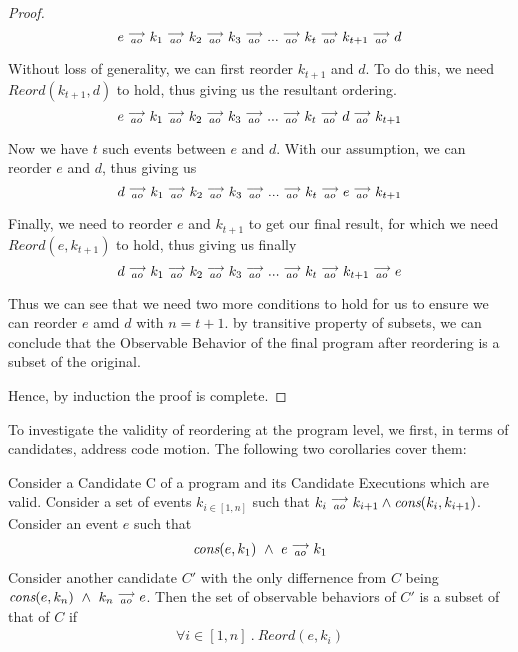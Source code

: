 \begin{proof}
        \[
            e\stackrel{\longrightarrow}{_{ao}}k_1\stackrel{\longrightarrow}{_{ao}}k_2\stackrel{\longrightarrow}{_{ao}}k_3\stackrel{\longrightarrow}{_{ao}}...\stackrel{\longrightarrow}{_{ao}}k_t\stackrel{\longrightarrow}{_{ao}}k_{t+1}\stackrel{\longrightarrow}{_{ao}}d  
        \]

        Without loss of generality, we can first reorder $k_{t+1}$ and $d$. To do this, we need $Reord(k_{t+1}, d)$ to hold, thus giving us the resultant ordering.
        \[
            e\stackrel{\longrightarrow}{_{ao}}k_1\stackrel{\longrightarrow}{_{ao}}k_2\stackrel{\longrightarrow}{_{ao}}k_3\stackrel{\longrightarrow}{_{ao}}...\stackrel{\longrightarrow}{_{ao}}k_t\stackrel{\longrightarrow}{_{ao}}d\stackrel{\longrightarrow}{_{ao}}k_{t+1}  
        \]
        
        Now we have $t$ such events between $e$ and $d$. With our assumption, we can reorder $e$ and $d$, thus giving us 
        \[
            d\stackrel{\longrightarrow}{_{ao}}k_1\stackrel{\longrightarrow}{_{ao}}k_2\stackrel{\longrightarrow}{_{ao}}k_3\stackrel{\longrightarrow}{_{ao}}...\stackrel{\longrightarrow}{_{ao}}k_t\stackrel{\longrightarrow}{_{ao}}e\stackrel{\longrightarrow}{_{ao}}k_{t+1}  
        \]

        Finally, we need to reorder $e$ and $k_{t+1}$ to get our final result, for which we need $Reord(e, k_{t+1})$ to hold, thus giving us finally
        \[
            d\stackrel{\longrightarrow}{_{ao}}k_1\stackrel{\longrightarrow}{_{ao}}k_2\stackrel{\longrightarrow}{_{ao}}k_3\stackrel{\longrightarrow}{_{ao}}...\stackrel{\longrightarrow}{_{ao}}k_t\stackrel{\longrightarrow}{_{ao}}k_{t+1}\stackrel{\longrightarrow}{_{ao}}e  
        \]

        Thus we can see that we need two more conditions to hold for us to ensure we can reorder $e$ amd $d$ with $n = t + 1$. by transitive property of subsets, we can conclude that the Observable Behavior of the final program after reordering is a subset of the original.

        Hence, by induction the proof is complete. 


\end{proof}
    

To investigate the validity of reordering at the program level, we first, in terms of candidates, address code motion. The following two corollaries cover them: 
\begin{corollary}
    Consider a Candidate C of a program and its Candidate Executions which are valid. Consider a set of events $k_{i \in[1,n]}$ such that $k_i\stackrel{\longrightarrow}{_{ao}}k_{i+1} \wedge \textit{cons}(k_i,k_{i+1})$.
    Consider an event $e$ such that 
    \begin{align*}
        \textit{cons}(e,k_1) \ \wedge \ e\stackrel{\longrightarrow}{_{ao}}k_1  
    \end{align*}
    Consider another candidate $C'$ with the only differnence from $C$ being $\cons{e}{k_n} \ \wedge \ \reln{k_n}{ao}{e}$.
    Then the set of observable behaviors of $C'$ is a subset of that of $C$ if 
    \begin{align}
        \forall i \in [1,n] \ . \ Reord(e,k_i)
    \end{align} 
\end{corollary}

